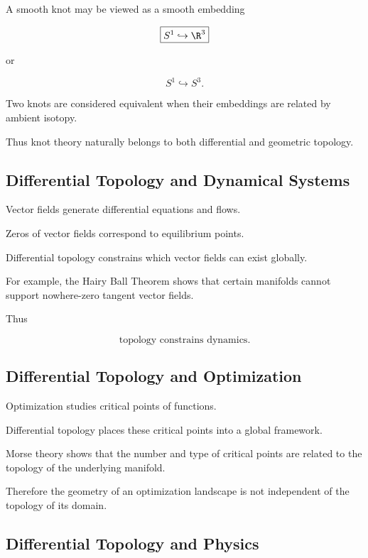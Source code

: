A smooth knot may be viewed as a smooth embedding

\[
\boxed{
S^1\hookrightarrow\R^3
}
\]

or

\[
S^1\hookrightarrow S^3.
\]

Two knots are considered equivalent when their embeddings are related by
ambient isotopy.

Thus knot theory naturally belongs to both differential and geometric
topology.

\subsection{Differential Topology and Dynamical Systems}
\label{subsec:differential-topology-dynamics}

Vector fields generate differential equations and flows.

Zeros of vector fields correspond to equilibrium points.

Differential topology constrains which vector fields can exist globally.

For example, the Hairy Ball Theorem shows that certain manifolds cannot
support nowhere-zero tangent vector fields.

Thus

\[
\boxed{
\text{topology constrains dynamics}.
}
\]

\subsection{Differential Topology and Optimization}
\label{subsec:differential-topology-optimization}

Optimization studies critical points of functions.

Differential topology places these critical points into a global framework.

Morse theory shows that the number and type of critical points are related
to the topology of the underlying manifold.

Therefore the geometry of an optimization landscape is not independent of
the topology of its domain.

\subsection{Differential Topology and Physics}
\label{subsec:differential-topology-physics}

